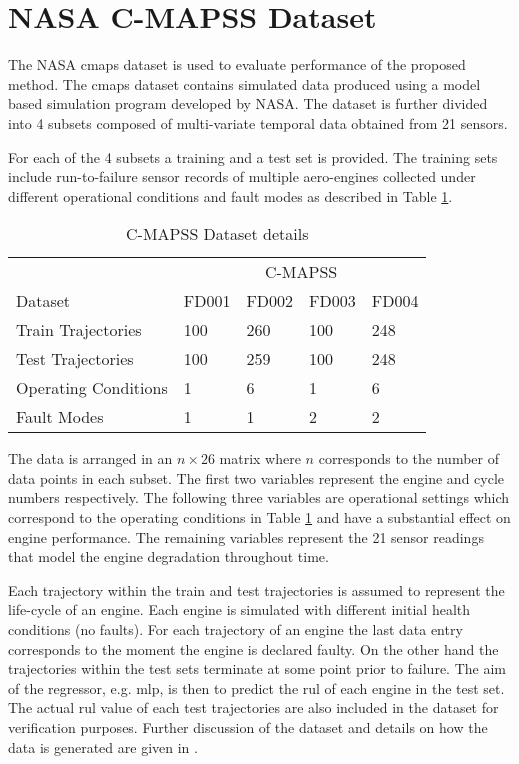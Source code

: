 \section{NASA C-MAPSS Dataset}
\label{sec:rul_dataset}

The NASA \gls{cmaps} dataset \cite{CMAPS2008} is used to evaluate performance of the proposed method. The \gls{cmaps} dataset contains simulated data produced using a model based simulation program developed by NASA. The dataset is further divided into 4 subsets composed of multi-variate temporal data obtained from 21 sensors.

For each of the 4 subsets a training and a test set is provided. The training sets include run-to-failure sensor records of multiple aero-engines collected under different operational conditions and fault modes as described in Table \ref{table:cmapss}.

\begin{table}[!htb]
\centering
\begin{tabular}{l | l l l l}
	\hline
	 & \multicolumn{4}{c}{C-MAPSS}\\  
	 Dataset & FD001 & FD002 & FD003 & FD004\\
  	\hline
  	Train Trajectories & 100 & 260 & 100 & 248\\
  	Test Trajectories & 100 & 259 & 100 & 248\\
  	Operating Conditions & 1 & 6 & 1 & 6\\
  	Fault Modes & 1 & 1 & 2 & 2\\
  	\hline
\end{tabular}
\caption{C-MAPSS Dataset details}
\label{table:cmapss}
\end{table}

The data is arranged in an $n\times26$ matrix where $n$ corresponds to the number of data points in each subset. The first two variables represent the engine and cycle numbers respectively. The following three variables are operational settings which correspond to the operating conditions in Table \ref{table:cmapss} and have a substantial effect on engine performance. The remaining variables represent the 21 sensor readings that model the engine degradation throughout time.

Each trajectory within the train and test trajectories is assumed to represent the life-cycle of an engine. Each engine is simulated with different initial health conditions (no faults). For each trajectory of an engine the last data entry corresponds to the moment the engine is declared faulty. On the other hand the trajectories within the test sets terminate at some point prior to failure. The aim of the regressor, e.g. \gls{mlp}, is then to predict the \gls{rul} of each engine in the test set. The actual \gls{rul} value of each test trajectories are also included in the dataset for verification purposes. Further discussion of the dataset and details on how the data is generated are given in \cite{Saxena2008}.

